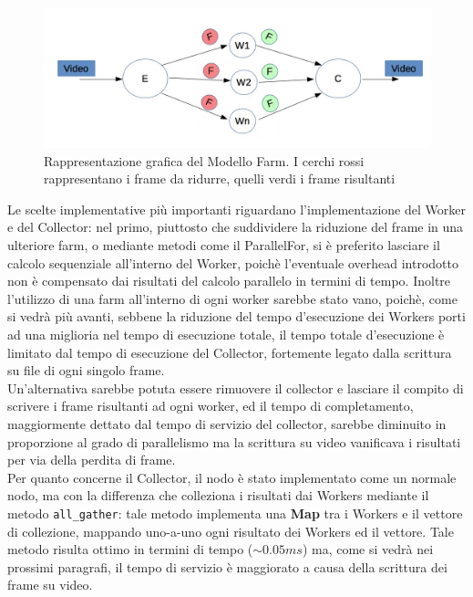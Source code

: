 \documentclass[12pt]{article}
\begin{document}
\begin{figure}[h]
  \centering
  \includegraphics[scale=.32,keepaspectratio]{farm.jpg}
  \caption{Rappresentazione grafica del Modello Farm. I cerchi rossi rappresentano i frame da ridurre, quelli verdi i frame risultanti}
  \label{img:ofarm}
\end{figure}

Le scelte implementative pi\`u importanti riguardano l'implementazione del Worker e del Collector: nel primo, piuttosto che suddividere la riduzione del frame in una ulteriore farm, o mediante metodi come il ParallelFor, si \`e preferito lasciare il calcolo sequenziale all'interno del Worker, poich\`e l'eventuale overhead introdotto non \`e compensato dai risultati del calcolo parallelo in termini di tempo. Inoltre l'utilizzo di una farm all'interno di ogni worker sarebbe stato vano, poich\`e, come si vedr\`a pi\`u avanti, sebbene la riduzione del tempo d'esecuzione dei Workers porti ad una miglioria nel tempo di esecuzione totale, il tempo totale d'esecuzione \`e limitato dal tempo di esecuzione del Collector, fortemente legato dalla scrittura su file di ogni singolo frame.
\\Un'alternativa sarebbe potuta essere rimuovere il collector e lasciare il compito di scrivere i frame risultanti ad ogni worker, ed il tempo di completamento, maggiormente dettato dal tempo di servizio del collector, sarebbe diminuito in proporzione al grado di parallelismo ma la scrittura su video vanificava i risultati per via della perdita di frame.
\\Per quanto concerne il Collector, il nodo \`e stato implementato come un normale nodo, ma con la differenza che colleziona i risultati dai Workers mediante il metodo \texttt{all\_gather}: tale metodo implementa una \textbf{Map} tra i Workers e il vettore di collezione, mappando uno-a-uno ogni risultato dei Workers ed il vettore. Tale metodo risulta ottimo in termini di tempo ($\sim 0.05 ms$) ma, come si vedr\`a nei prossimi paragrafi, il tempo di servizio \`e maggiorato a causa della scrittura dei frame su video.
\end{document}
